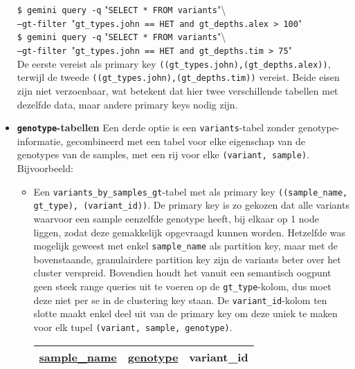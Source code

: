 \begin{itemize}
\noindent\texttt{\$ gemini query -q} "\texttt{SELECT * FROM variants}"\textbackslash \\\texttt{--gt-filter }"\texttt{gt\_types.john == HET and gt\_depths.alex > 100}"\\

\noindent\texttt{\$ gemini query -q} "\texttt{SELECT * FROM variants}"\textbackslash \\\texttt{--gt-filter }"\texttt{gt\_types.john == HET and gt\_depths.tim > 75}"\\

De eerste vereist als primary key \texttt{((gt\_types.john),(gt\_depths.alex))}, terwijl de tweede \texttt{((gt\_types.john),(gt\_depths.tim))} vereist. Beide eisen zijn niet verzoenbaar, wat betekent dat hier twee verschillende tabellen met dezelfde data, maar andere primary keys nodig zijn.

\item \textbf{\texttt{genotype}-tabellen} Een derde optie is een \texttt{variants}-tabel zonder genotype-informatie, gecombineerd met een tabel voor elke eigenschap van de genotypes van de samples, met een rij voor elke \texttt{(variant, sample)}. Bijvoorbeeld:\\

\begin{itemize}

\item Een \texttt{variants\_by\_samples\_gt}-tabel met als primary key \texttt{((sample\_name, gt\_type), (variant\_id))}. De primary key is zo gekozen dat alle variants waarvoor een sample eenzelfde genotype heeft, bij elkaar op 1 node liggen, zodat deze gemakkelijk opgevraagd kunnen worden. Hetzelfde was mogelijk geweest met enkel \texttt{sample\_name} als partition key, maar met de bovenstaande, granulairdere partition key zijn de variants beter over het cluster verspreid. Bovendien houdt het vanuit een semantisch oogpunt geen steek range queries uit te voeren op de \texttt{gt\_type}-kolom, dus moet deze niet per se in de clustering key staan. De \texttt{variant\_id}-kolom ten slotte maakt enkel deel uit van de primary key om deze uniek te maken voor elk tupel \texttt{(variant, sample, genotype)}.\\

\begin{table}[!htbp]
\begin{tabular}{@{}|l|l|l|@{}}
\toprule
\color{ForestGreen} \underline{sample\_name} & \color{ForestGreen} \underline{genotype} & \color{red} variant\_id \\ \bottomrule
\end{tabular}\\
\end{table}


\end{itemize}
\end{itemize}
